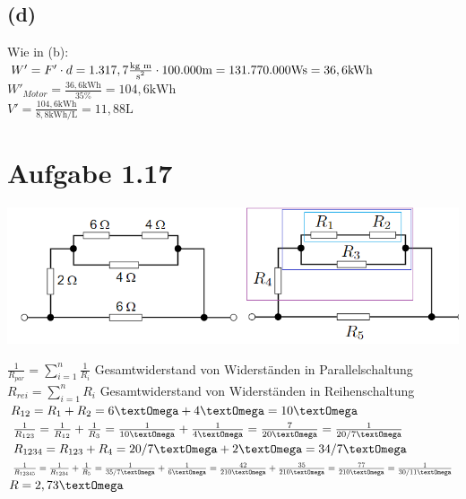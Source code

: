 \documentclass[]{article}
\newcommand{\unit}[1]{\text{#1}}
\newcommand{\fracunit}[2]{\frac{\unit{#1}}{\unit{#2}}}
\newcommand{\textsq}[1]{\ensuremath{\text{#1}^2}}
\begin{document}
\subsection*{(d)}
	Wie in (b):\\
	$W' = F' \cdot d = 1.317,7\fracunit{kg~m}{\textsq{s}} \cdot 100.000\unit{m} = 131.770.000\unit{Ws} = 36,6\unit{kWh}$\\
	$W'_{Motor} = \frac{36,6\unit{kWh}}{35\%} = 104,6\unit{kWh}$\\
	$V' = \frac{104,6\unit{kWh}}{8,8\unit{kWh/L}} = 11,88\unit{L}$

\section*{Aufgabe 1.17}
\par
	\includegraphics[scale=0.6]{Bilder/Skizze_A1_17.png}\par
	$\frac{1}{R_{par}} = \sum_{i=1}^{n} \frac{1}{R_i}$ Gesamtwiderstand von Widerständen in Parallelschaltung \\
	$R_{rei} = \sum_{i=1}^{n} {R_i}$ Gesamtwiderstand von Widerständen in Reihenschaltung \\

	$R_{12} = R_1 + R_2 = 6\unit{\textOmega} + 4\unit{\textOmega} = 10\unit{\textOmega}$\\
	$\frac{1}{R_{123}} = \frac{1}{R_{12}} + \frac{1}{R_3} = \frac{1}{10\unit{\textOmega}}+ \frac{1}{4\unit{\textOmega}} = \frac{7}{20\unit{\textOmega}} = \frac{1}{20/7\unit{\textOmega}}$\\
	$R_{1234} = R_{123} +  R_4 = 20/7\unit{\textOmega} + 2\unit{\textOmega} = 34/7\unit{\textOmega}$\\
	$\frac{1}{R_{12345}} = \frac{1}{R_{1234}} + \frac{1}{R_5} = \frac{1}{35/7\unit{\textOmega}} + \frac{1}{6\unit{\textOmega}} = \frac{42}{210\unit{\textOmega}} + \frac{35}{210\unit{\textOmega}} = \frac{77}{210\unit{\textOmega}} = \frac{1}{30/11\unit{\textOmega}}$\\
	$R = 2,73\unit{\textOmega}$
\end{document}
